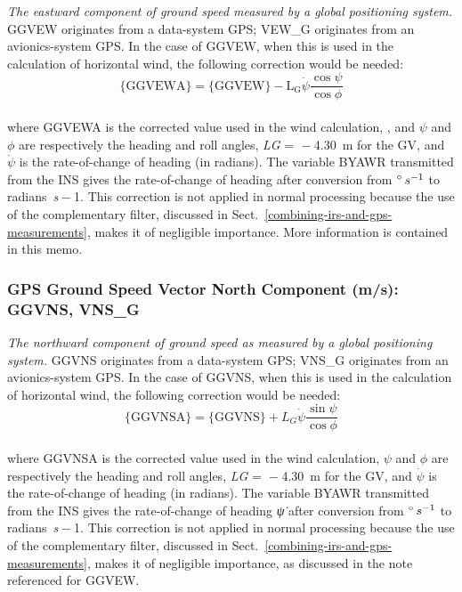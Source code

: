 \documentclass[
]{book}
\begin{document}
\emph{The eastward component of ground speed measured by a global positioning system.} GGVEW originates from a data-system GPS; VEW\_G originates from an avionics-system GPS. In the case of GGVEW, when this is used in the calculation of horizontal wind, the following correction would be needed:
\begin{equation}
\mathrm{\{GGVEWA\}}=\mathrm{\{GGVEW\}-L_G}\dot{\psi}\frac{\cos\psi}{\cos\phi}
\label{eq:GGVEWA}
\end{equation}\\
where GGVEWA is the corrected value used in the wind calculation, , and \(\psi\) and \(\phi\) are respectively the heading and roll angles, {\emph{L}\emph{G} =  − 4.30}~m for the GV, and \(\dot{\psi}\) is the rate-of-change of heading (in radians). The variable BYAWR transmitted from the INS gives the rate-of-change of heading after conversion from {\(^{\circ}\thinspace s^{-1}\)} to radians~{\emph{s} − 1}. This correction is not applied in normal processing because the use of the complementary filter, discussed in Sect.~\ref{combining-irs-and-gps-measurements}, makes it of negligible importance. More information is contained in this memo.

\hypertarget{ggvns}{%
\subsubsection*{GPS Ground Speed Vector North Component (m/s): GGVNS, VNS\_G}\label{ggvns}}

\emph{The northward component of ground speed as measured by a global positioning system.} GGVNS originates from a data-system GPS; VNS\_G originates from an avionics-system GPS. In the case of GGVNS, when this is used in the calculation of horizontal wind, the following correction would be needed:
\begin{equation}
\mathrm{\{GGVNSA\}} = \mathrm{\{GGVNS\}}+L_{G}\dot{\psi}\frac{\sin\psi}{\cos\phi}
\label{eq:GGVNSA}
\end{equation}\\
where GGVNSA is the corrected value used in the wind calculation, \(\psi\) and \(\phi\) are respectively the heading and roll angles, {\emph{L}\emph{G} =  − 4.30}~m for the GV, and \(\dot{\psi}\) is the rate-of-change of heading (in radians). The variable BYAWR transmitted from the INS gives the rate-of-change of heading {\emph{ψ̇}} after conversion from {\(^{\circ}\thinspace s^{-1}\)} to radians~{\emph{s} − 1}. This correction is not applied in normal processing because the use of the complementary filter, discussed in Sect.~\ref{combining-irs-and-gps-measurements}, makes it of negligible importance, as discussed in the note referenced for GGVEW.
\end{document}
